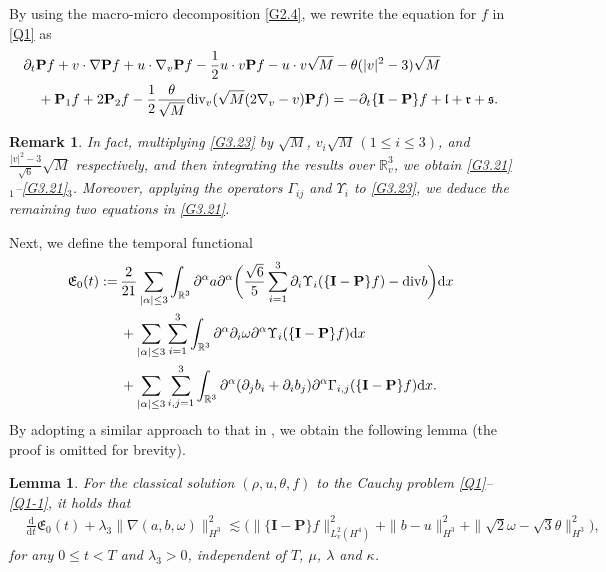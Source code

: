 \documentclass[reqno,11pt]{amsart}
\theoremstyle{plain}
\newtheorem{lem}[thm]{Lemma}
\newtheorem{rem}{Remark}[section]
\numberwithin{equation}{section}
\begin{document}
 By using the macro-micro decomposition \eqref{G2.4}, we rewrite the equation for $f$ in \eqref{Q1} as 
\begin{align}\label{G3.23}  
& \partial_t \mathbf{P} f + v \cdot \nabla \mathbf{P} f + u \cdot \nabla_v \mathbf{P} f - \frac{1}{2} u \cdot v \mathbf{P} f - u \cdot v \sqrt{M} - \theta (|v|^2 - 3) \sqrt{M} \nonumber \\  
& \quad+ \mathbf{P}_1 f + 2 \mathbf{P}_2 f - \frac{1}{2}\frac{\theta}{\sqrt{M}}  {\rm div}_v  ( \sqrt{M}  ( 2\nabla_v - v  ) \mathbf{P} f )  = -\partial_t \{\mathbf{I} - \mathbf{P}\} f + \mathfrak{l} + \mathfrak{r} + \mathfrak{s}.  
\end{align}
\begin{rem}
In fact, multiplying \eqref{G3.23} by $\sqrt{M}$, $v_i\sqrt{M}\, (1\leq i\leq 3)$, and $\frac{|v|^2-3}{\sqrt{6}}\sqrt{M}$ respectively, and then integrating the results over $\mathbb{R}^3_v$, we obtain \eqref{G3.21}$_1$--\eqref{G3.21}$_3$. Moreover, applying the operators $\Gamma_{i j}$ and $\Upsilon_i$ to \eqref{G3.23}, we deduce the remaining two equations in \eqref{G3.21}.
\end{rem}
Next, we  define the temporal functional
\begin{align}\nonumber%
 \mathfrak{E}_0(t):= \, &\frac{2}{21} \sum_{|\alpha| \leq 3} \int_{\mathbb{R}^3} \partial ^\alpha a \partial^\alpha\bigg(\frac{\sqrt{6}}{5} \sum_{i=1}^3 \partial_i \Upsilon_i(\{\mathbf{I}-\mathbf{P}\} f)-{\rm div}   b\bigg) \mathrm{d} x \nonumber\\
& +\sum_{|\alpha| \leq 3} \sum_{i=1}^3 \int_{\mathbb{R}^3} \partial^\alpha \partial_i \omega \partial^\alpha \Upsilon_i(\{\mathbf{I}-\mathbf{P}\} f) \mathrm{d} x  \nonumber\\
& + \sum_{|\alpha| \leq 3} \sum_{i, j=1}^3 \int_{\mathbb{R}^3} \partial^\alpha (\partial_j b_i+\partial_i b_j ) \partial ^\alpha \Gamma_{i, j}(\{\mathbf{I}-\mathbf{P}\} f) \mathrm{d} x .
\end{align} 
By adopting a similar approach to that in \cite{LNW-arXiv-2025,Mu-Wang-20}, we obtain the following lemma (the proof is omitted for brevity).
\begin{lem}\label{L3.3}
For the  classical solution $(\rho, u,\theta,f)$ to the Cauchy problem \eqref{Q1}--\eqref{Q1-1}, it holds that 
\begin{align}\label{G3.24}
& \frac{\mathrm{d}}{\mathrm{d} t} \mathfrak{E}_0(t)+\lambda_3 \|\nabla (a, b, \omega) \|_{H^3}^2  \lesssim \big(\|\{\mathbf{I}-\mathbf{P}\} f\|_{L_v^2 (H^4 )}^2+\|b-u\|_{H^3}^2+\|\sqrt{2} \omega-\sqrt{3} \theta\|_{H^3}^2 \big),
\end{align}
for any $0 \leq t < T$ and $\lambda_3>0$, independent of  $T$, $\mu$, $\lambda$ and
$\kappa$. 
\end{lem}
\end{document}
